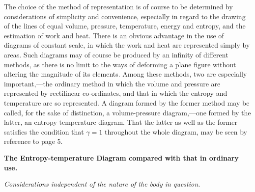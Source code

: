 \documentclass[11pt]{article}
\begin{document}
The choice of the method of representation is of course to be determined by considerations of simplicity and convenience, especially in regard to the drawing of the lines of equal volume, pressure, temperature, energy and entropy, and the estimation of work and heat. There is an obvious advantage in the use of diagrams of constant scale, in which the work and heat are represented simply by areas. Such diagrams may of course be produced by an infinity of different methods, as there is no limit to the ways of deforming a plane figure without altering the magnitude of its elements. Among these methods, two are especially important,---the ordinary method in which the volume and pressure are represented by rectilinear co-ordinates, and that in which the entropy and temperature are so represented. A diagram formed by the former method may be called, for the sake of distinction, a volume-pressure diagram,---one formed by the latter, an entropy-temperature diagram. That the latter as well as the former satisfies the condition that $\gamma=1$ throughout the whole diagram, may be seen by reference to page 5.

\begin{center}
\bfseries The Entropy-temperature Diagram compared with that in ordinary use.
\end{center}
\begin{center}
\itshape Considerations independent of the nature of the body in question.
\end{center}
\end{document}
